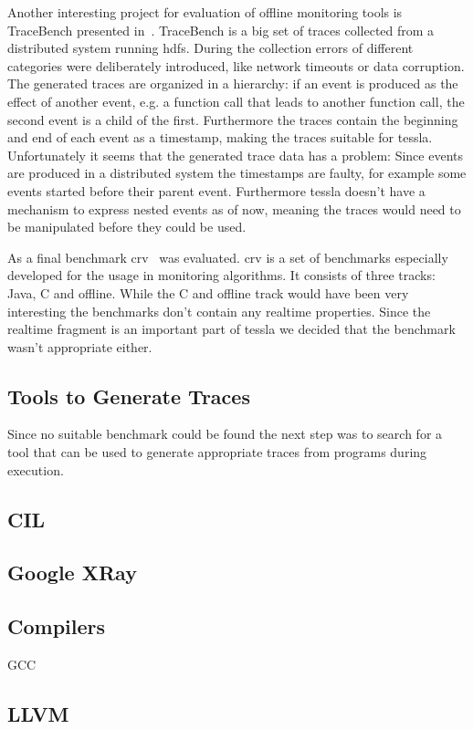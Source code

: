 Another interesting project for evaluation of offline monitoring tools is TraceBench presented in~\cite{Zhou2014}.
TraceBench is a big set of traces collected from a distributed system running \gls{hdfs}.
During the collection errors of different categories were deliberately introduced, like network timeouts or data corruption.
The generated traces are organized in a hierarchy: if an event is produced as the effect of another event, e.g. a function call that leads to another function call, the second event is a child of the first.
Furthermore the traces contain the beginning and end of each event as a timestamp, making the traces suitable for \gls{tessla}.
Unfortunately it seems that the generated trace data has a problem: Since events are produced in a distributed system the timestamps are faulty, for example some events started before their parent event.
Furthermore \gls{tessla} doesn't have a mechanism to express nested events as of now, meaning the traces would need to be manipulated before they could be used.

As a final benchmark \gls{crv}~\citep{Reger2016} was evaluated.
\Gls{crv} is a set of benchmarks especially developed for the usage in monitoring algorithms.
It consists of three tracks: Java, C and offline.
While the C and offline track would have been very interesting the benchmarks don't contain any realtime properties.
Since the realtime fragment is an important part of \gls{tessla} we decided that the benchmark wasn't appropriate either.

\subsection{Tools to Generate Traces}

Since no suitable benchmark could be found the next step was to search for a tool that can be used to generate appropriate traces from programs during execution.
\subsection{CIL}
\subsection{Google XRay}
\subsection{Compilers}
GCC
\subsection{LLVM}
\label{sec:related:traces:llvm}

